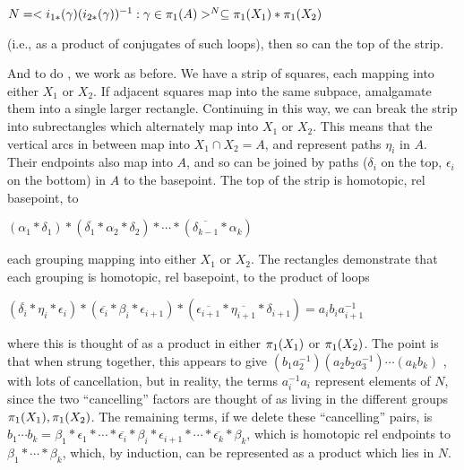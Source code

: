 $N = <i_{1*}(\gamma)(i_{2*}(\gamma))^{-1} : 
\gamma\in\pi_1(A) >^N\subseteq \pi_1(X_1)*\pi_1(X_2)$ 

(i.e., as a product
of conjugates of such loops), then so can the 
top of the strip. 

\msk

\leavevmode

\epsfxsize=4in

\msk

And to do , we work as before. We have a strip of squares,
each mapping into either $X_1$ or $X_2$. If adjacent squares map into the
same subpace, amalgamate them into a single larger rectangle. Continuing
in this way, we can break the strip into subrectangles which
alternately map into $X_1$ or $X_2$. This means that the vertical arcs
in between map into $X_1\cap X_2 = A$, and represent paths $\eta_i$ in 
$A$. Their endpoints also map into $A$,
and so can be joined by paths ($\delta_i$  on the top, $\epsilon_i$ 
on the bottom) in $A$ to the basepoint. The top of the strip is
homotopic, rel basepoint, to 

$(\alpha_1*\delta_1)*(\overline{\delta_1}*\alpha_2*\delta_2)*\cdots *
(\overline{\delta_{k-1}}*\alpha_k)$

each grouping mapping into either $X_1$ or $X_2$.
The rectangles demonstrate that each grouping is homotopic, rel basepoint,
to the product of loops

$(\overline{\delta_i}*\eta_i*\epsilon_i)*
(\overline{\epsilon_i}*\beta_i*\epsilon_{i+1})*
(\overline{\epsilon_{i+1}}*\overline{\eta_{i+1}}*\delta_{i+1})
=a_i b_i a_{i+1}^{-1}$

where this is thought of as a product in either $\pi_1(X_1)$ or
$\pi_1(X_2)$. The point is that when strung together, this appears
to give $(b_1a_2^{-1})(a_2b_2a_3^{-1})\cdots (a_kb_k)$ , with lots
of cancellation, but in reality, the terms $a_i^{-1}a_i$ represent
elements of $N$, since the two ``cancelling'' 
factors are thought of as living in the
different groups $\pi_1(X_1),\pi_1(X_2)$. The remaining terms, if we
delete these ``cancelling'' pairs, is 
$b_1\cdots b_k = 
\beta_1*\epsilon_1*\cdots *\overline{\epsilon_i}*\beta_i*\epsilon_{i+1}
*\cdots * \overline{\epsilon_k}*\beta_k$, which is homotopic
rel endpoints to $\beta_1*\cdots *\beta_k$, which, by induction, can 
be represented as a product which lies in $N$. 

\msk




\leavevmode


